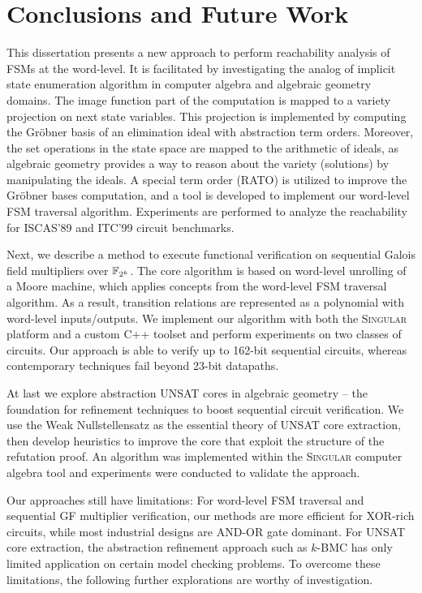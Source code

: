 \chapter{Conclusions and Future Work}
\label{ch:conclude}
This dissertation presents a new approach to perform reachability
analysis of FSMs at the word-level. It is facilitated by investigating the analog of 
implicit state enumeration algorithm in computer algebra and algebraic
geometry domains. The image function part of the computation is mapped to a variety projection on 
next state variables. This projection is implemented by computing the 
Gr\"obner basis of an elimination ideal with abstraction term orders.
Moreover, the set operations in the state space are mapped to 
the arithmetic of ideals, as algebraic geometry provides a 
way to reason about the variety (solutions) by manipulating the ideals.
A special term order (RATO) is utilized to improve the Gr\"obner bases 
computation, and a tool is developed to implement our 
word-level FSM traversal algorithm. Experiments are performed to 
analyze the reachability for ISCAS'89 and ITC'99 circuit benchmarks.

Next, we describe a method to execute functional verification on sequential Galois field
multipliers over ${\mathbb{F}}_{2^k}$.  The core algorithm is based on word-level unrolling of 
a Moore machine, which applies concepts from the word-level FSM traversal 
algorithm. As a result, transition relations are represented 
as a polynomial with word-level inputs/outputs.
We implement our algorithm with both the \textsc{Singular} platform and a custom C++ toolset 
and perform experiments on two classes of circuits.
Our approach is able to verify up to 162-bit sequential
circuits, whereas contemporary techniques fail beyond 23-bit
datapaths.  

At last we explore abstraction UNSAT cores in algebraic geometry -- the foundation for refinement techniques
to boost sequential circuit verification.
We use the Weak Nullstellensatz as the essential theory of UNSAT core extraction, 
then develop heuristics to improve the core that exploit the structure of the refutation proof.
An algorithm was implemented within the \textsc{Singular} computer algebra tool
and experiments were conducted to validate the approach.

Our approaches still have limitations: For word-level FSM traversal and 
sequential GF multiplier verification, our methods are more efficient
for XOR-rich circuits, while most industrial designs are AND-OR gate dominant.
For UNSAT core extraction, the abstraction refinement approach such as $k$-BMC 
has only limited application on certain model checking problems. To overcome these limitations,
the following further explorations are worthy of investigation. 
  
